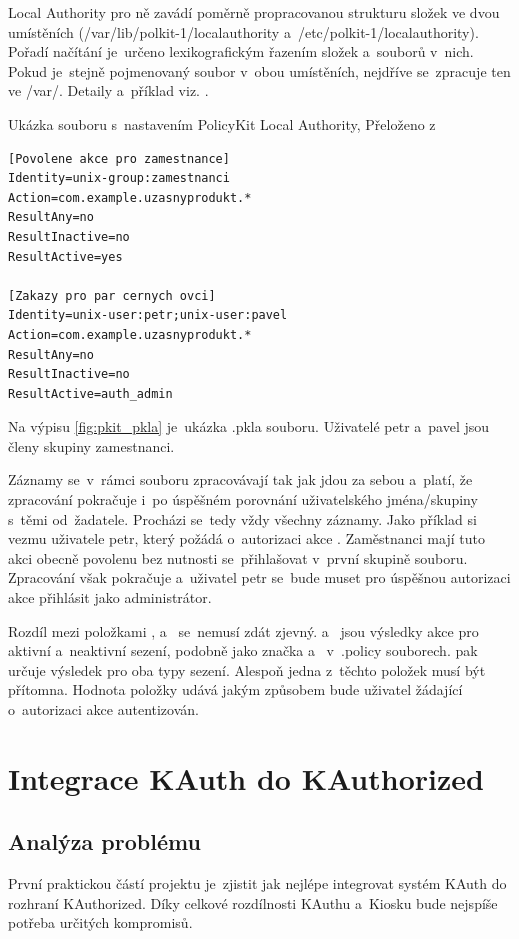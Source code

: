 Local Authority pro ně zavádí poměrně propracovanou strukturu složek ve dvou umístěních (/var/lib/polkit-1/localauthority a~/etc/polkit-1/localauthority). Pořadí načítání je~určeno lexikografickým řazením složek a~souborů v~nich. Pokud je~stejně pojmenovaný soubor v~obou umístěních, nejdříve se~zpracuje ten ve /var/. Detaily a~příklad viz. \cite{manpklocalauth}.

\begin{mylisting}
\caption{Ukázka souboru s~nastavením PolicyKit Local Authority, Přeloženo z~\cite{manpklocalauth}}
\label{fig:pkit_pkla}
\begin{lstlisting}
[Povolene akce pro zamestnance]
Identity=unix-group:zamestnanci
Action=com.example.uzasnyprodukt.*
ResultAny=no
ResultInactive=no
ResultActive=yes

[Zakazy pro par cernych ovci]
Identity=unix-user:petr;unix-user:pavel
Action=com.example.uzasnyprodukt.*
ResultAny=no
ResultInactive=no
ResultActive=auth_admin
\end{lstlisting}
\end{mylisting}

Na výpisu \ref{fig:pkit_pkla} je~ukázka .pkla souboru. Uživatelé petr a~pavel jsou členy skupiny zamestnanci.

Záznamy se~v~rámci souboru zpracovávají tak jak jdou za sebou a~platí, že zpracování pokračuje i~po úspěšném porovnání uživatelského jména/skupiny s~těmi od~žadatele. Procházi se~tedy vždy všechny záznamy. Jako příklad si vezmu uživatele petr, který požádá o~autorizaci akce . Zaměstnanci mají tuto akci obecně povolenu bez nutnosti se~přihlašovat v~první skupině souboru. Zpracování však pokračuje a~uživatel petr se~bude muset pro úspěšnou autorizaci akce přihlásit jako administrátor.

Rozdíl mezi položkami ,  a~ se~nemusí zdát zjevný.  a~ jsou výsledky akce pro aktivní a~neaktivní sezení, podobně jako značka  a~ v~.policy souborech.  pak určuje výsledek pro oba typy sezení. Alespoň jedna z~těchto položek musí být přítomna. Hodnota položky udává jakým způsobem bude uživatel žádající o~autorizaci akce autentizován.

\chapter{Integrace KAuth do KAuthorized}
\section{Analýza problému}
První praktickou částí projektu je~zjistit jak nejlépe integrovat systém KAuth do rozhraní KAuthorized. Díky celkové rozdílnosti KAuthu a~Kiosku bude nejspíše potřeba určitých kompromisů.

